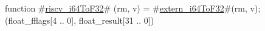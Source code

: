 function #\hyperref[sailRISCVzriscvzyi64ToF32]{riscv\_i64ToF32}# (rm, v) = {
  #\hyperref[sailRISCVzexternzyi64ToF32]{extern\_i64ToF32}#(rm, v);
  (float_fflags[4 .. 0], float_result[31 .. 0])
}
